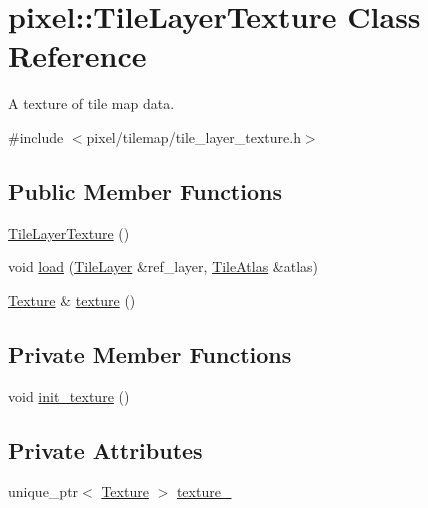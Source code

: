 \hypertarget{classpixel_1_1_tile_layer_texture}{}\section{pixel\+:\+:Tile\+Layer\+Texture Class Reference}
\label{classpixel_1_1_tile_layer_texture}


A texture of tile map data.  




{\ttfamily \#include $<$pixel/tilemap/tile\+\_\+layer\+\_\+texture.\+h$>$}

\subsection*{Public Member Functions}
\begin{DoxyCompactItemize}
\item 
\hyperlink{classpixel_1_1_tile_layer_texture_a076437702e98f38225ad1783f6202c56}{Tile\+Layer\+Texture} ()
\item 
void \hyperlink{classpixel_1_1_tile_layer_texture_a8f3869c6590ada59bc771fd2ddb6b6ca}{load} (\hyperlink{classpixel_1_1_tile_layer}{Tile\+Layer} \&ref\+\_\+layer, \hyperlink{classpixel_1_1_tile_atlas}{Tile\+Atlas} \&atlas)
\item 
\hyperlink{classpixel_1_1graphics_1_1_texture}{Texture} \& \hyperlink{classpixel_1_1_tile_layer_texture_a1523473ccda6c2cc6721aaaa0bce185e}{texture} ()
\end{DoxyCompactItemize}
\subsection*{Private Member Functions}
\begin{DoxyCompactItemize}
\item 
void \hyperlink{classpixel_1_1_tile_layer_texture_a8e3b490e85de91b69fd91ef11754a159}{init\+\_\+texture} ()
\end{DoxyCompactItemize}
\subsection*{Private Attributes}
\begin{DoxyCompactItemize}
\item 
unique\+\_\+ptr$<$ \hyperlink{classpixel_1_1graphics_1_1_texture}{Texture} $>$ \hyperlink{classpixel_1_1_tile_layer_texture_aa37d5b79760867af790492c692a4cb36}{texture\+\_\+}
\end{DoxyCompactItemize}


